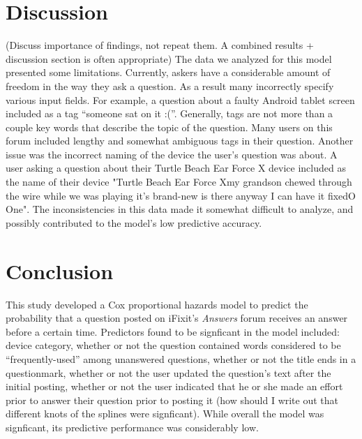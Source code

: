 \documentclass{article}
\begin{document}
\section*{Discussion}

(Discuss importance of findings, not repeat them. A combined results + discussion section is often appropriate) 
The data we analyzed for this model presented some limitations. Currently, askers have a considerable amount of freedom in the way they ask a question. As a result many incorrectly specify various input fields. For example, a question about a faulty Android tablet screen included as a tag ``someone sat on it :(''. Generally, tags are not more than a couple key words that describe the topic of the question. Many users on this forum included lengthy and somewhat ambiguous tags in their question. Another issue was the incorrect naming of the device the user's question was about. A user asking a question about their Turtle Beach Ear Force X device included as the name of their device "Turtle Beach Ear Force Xmy grandson chewed through the wire while we was playing it's brand-new is there anyway I can have it fixedO One". The inconsistencies in this data made it somewhat difficult to analyze, and possibly contributed to the model's low predictive accuracy. 


\section*{Conclusion}

This study developed a Cox proportional hazards model to predict the probability that a question posted on iFixit's \textit{Answers} forum receives an answer before a certain time. Predictors found to be signficant in the model included: device category, whether or not the question contained words considered to be ``frequently-used'' among unanswered questions, whether or not the title ends in a questionmark, whether or not the user updated the question's text after the initial posting, whether or not the user indicated that he or she made an effort prior to answer their question prior to posting it (how should I write out that different knots of the splines were signficant). While overall the model was signficant, its predictive performance was considerably low. 

\end{document}

